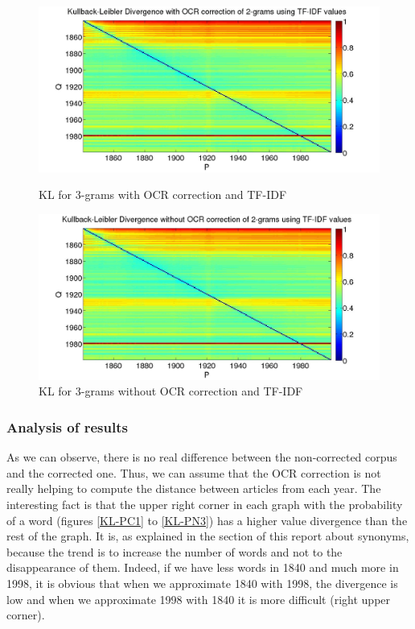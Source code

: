 \begin{figure}[h!]
    \begin{minipage}[b]{0.48\linewidth}
        \includegraphics[scale=0.15]{Pictures/kullback-leibler/KL_2-grams_with_correction_tfidf.jpg}
        \caption{KL for 3-grams with OCR correction and TF-IDF}
        \label{KL-TC3}
    \end{minipage}\hfill
    \begin{minipage}[b]{0.5\linewidth}
        \includegraphics[scale=0.15]{Pictures/kullback-leibler/KL_2-grams_without_correction_tfidf.jpg}
        \caption{KL for 3-grams without OCR correction and TF-IDF}
        \label{KL-TN3}
    \end{minipage}\hfill
\end{figure}

\subsubsection{Analysis of results}
As we can observe, there is no real difference between the non-corrected corpus and the corrected one. Thus, we can assume that the OCR correction is not really helping to compute the distance between articles from each year. The interesting fact is that the upper right corner in each graph with the probability of a word (figures \ref{KL-PC1} to \ref{KL-PN3}) has a higher value divergence than the rest of the graph. It is, as explained in the section of this report about synonyms, because the trend is to increase the number of words and not to the disappearance of them. Indeed, if we have less words in 1840 and much more in 1998, it is obvious that when we approximate 1840 with 1998, the divergence is low and when we approximate 1998 with 1840 it is more difficult (right upper corner).

